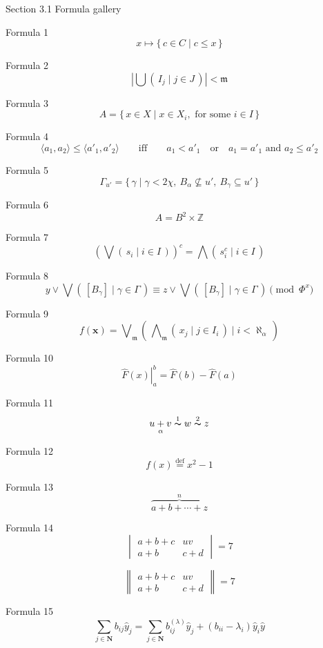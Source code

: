 \documentclass{article}
\begin{document}
Section 3.1 Formula gallery

Formula 1 
\[
   x \mapsto \{\, c \in C \mid c \leq x \,\} 
\]

Formula 2
\[ 
   \left| \bigcup (\, I_{j} \mid j \in J \,) \right| 
    < \mathfrak{m}
\]

Formula 3
\[ 
   A = \{\, x \in X \mid x \in X_{i}, 
         \mbox{ for some } i \in I \,\} 
\]

Formula 4
\[
   \langle a_{1}, a_{2} \rangle \leq \langle a'_{1}, a'_{2}\rangle
    \qquad \mbox{if{f}} \qquad a_{1} < a'_{1} \quad  \mbox{or} 
    \quad a_{1} = a'_{1} \mbox{ and } a_{2} \leq a'_{2} 
\]

Formula 5
\[ 
   \Gamma_{u'} = \{\, \gamma \mid \gamma < 2\chi, 
    \ B_{\alpha} \nsubseteq u', \ B_{\gamma} \subseteq u' \,\} 
\]

Formula 6
\[
   A = B^{2} \times \mathbb{Z}
\]

Formula 7
\[
   \left( \bigvee (\, s_{i} \mid i \in I \,) \right)^{c} = 
    \bigwedge (\, s_{i}^{c} \mid i \in I \,) 
\]

Formula 8
\[ 
   y \vee \bigvee (\, [B_{\gamma}] \mid \gamma 
    \in \Gamma \,) \equiv z \vee \bigvee (\, [B_{\gamma}] 
    \mid \gamma \in \Gamma \,) \pmod{ \Phi^{x} } 
\]

Formula 9
\[ 
   f(\mathbf{x}) = \bigvee\nolimits_{\!\mathfrak{m}} 
    \left(\, 
       \bigwedge\nolimits_{\mathfrak{m}}
       (\, x_{j} \mid j \in I_{i} \,) \mid i < \aleph_{\alpha} 
    \,\right)
\]

Formula 10
\[
   \left. \widehat{F}(x) \right|_{a}^{b} = 
      \widehat{F}(b) - \widehat{F}(a)
\]

Formula 11
\[
  u \underset{\alpha}{+} v \overset{1}{\thicksim} w 
    \overset{2}{\thicksim} z 
\]

Formula 12
\[
   f(x) \overset{ \text{def} }{=} x^{2} - 1
\]

Formula 13
\[
   \overbrace{a + b + \cdots + z}^{n}
\]

Formula 14
\[
   \begin{vmatrix} 
      a + b + c & uv\\ 
      a + b & c + d 
   \end{vmatrix}
   = 7
\]

\[
   \begin{Vmatrix} 
      a + b + c & uv\\ 
      a + b & c + d 
   \end{Vmatrix} 
   = 7
\]

Formula 15
\[
   \sum_{j \in \mathbf{N}} b_{ij} \hat{y}_{j} = 
   \sum_{j \in \mathbf{N}} b^{(\lambda)}_{ij} \hat{y}_{j} + 
   (b_{ii} - \lambda_{i}) \hat{y}_{i} \hat{y} 
\]
\end{document}
